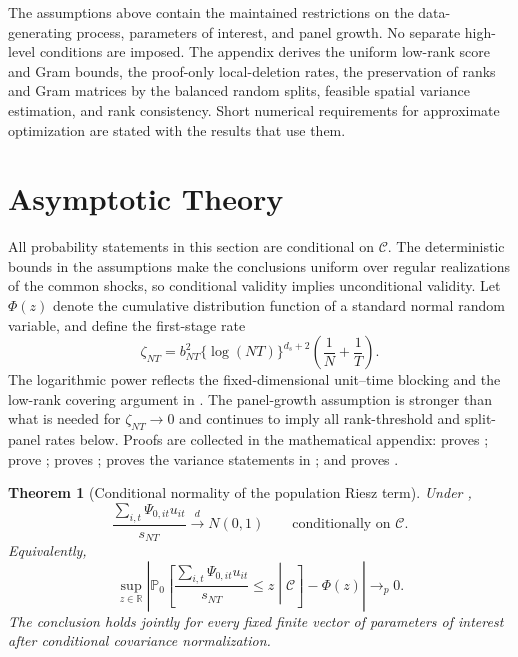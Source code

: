\documentclass[11pt]{article}
\numberwithin{equation}{section}
\newtheorem{theorem}{Theorem}
\theoremstyle{remark}
\newcommand{\R}{\mathbb R}
\newcommand{\Pzero}{\mathbb P_0}
\begin{document}
The assumptions above contain the maintained restrictions on the data-generating process, parameters of interest, and panel growth. No separate high-level conditions are imposed. The appendix derives the uniform low-rank score and Gram bounds, the proof-only local-deletion rates, the preservation of ranks and Gram matrices by the balanced random splits, feasible spatial variance estimation, and rank consistency. Short numerical requirements for approximate optimization are stated with the results that use them.


\section{Asymptotic Theory}
\label{sec:theory}

All probability statements in this section are conditional on $\mathscr C$. The deterministic bounds in the assumptions make the conclusions uniform over regular realizations of the common shocks, so conditional validity implies unconditional validity. Let $\Phi(z)$ denote the cumulative distribution function of a standard normal random variable, and define the first-stage rate
$$
\zeta_{NT}
=
b_{NT}^2\{\log(NT)\}^{d_s+2}
\left(\frac1N+\frac1T\right).
$$
The logarithmic power reflects the fixed-dimensional unit--time blocking and the low-rank covering argument in . The panel-growth assumption is stronger than what is needed for $\zeta_{NT}\to0$ and continues to imply all rank-threshold and split-panel rates below.
Proofs are collected in the mathematical appendix:  proves ;  prove ;  proves ;  proves the variance statements in ; and  proves .

\begin{theorem}[Conditional normality of the population Riesz term]
\label{thm:population_clt}
Under ,
$$
\frac{\sum_{i,t}\Psi_{0,it}u_{it}}{s_{NT}}
\xrightarrow{d}
N(0,1)
\qquad
\text{conditionally on }\mathscr C.
$$
Equivalently,
\begin{equation}
\label{eq:conditional_clt}
\sup_{z\in\R}
\left|
\Pzero\!\left[
\frac{\sum_{i,t}\Psi_{0,it}u_{it}}{s_{NT}}\le z
\middle|\mathscr C
\right]
-\Phi(z)
\right|
\longrightarrow_p0.
\end{equation}
The conclusion holds jointly for every fixed finite vector of parameters of interest after conditional covariance normalization.
\end{theorem}
\end{document}
